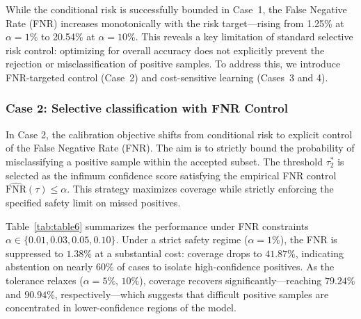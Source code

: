 \documentclass[sigconf,review,anonymous]{acmart}
\theoremstyle{remark}
\begin{document}
While the conditional risk is successfully bounded in Case~1, the False Negative Rate (FNR) increases monotonically with the risk target—rising from 1.25\% at $\alpha=1\%$ to 20.54\% at $\alpha=10\%$. This reveals a key limitation of standard selective risk control: optimizing for overall accuracy does not explicitly prevent the rejection or misclassification of positive samples. To address this, we introduce FNR-targeted control (Case~2) and cost-sensitive learning (Cases~3 and 4).

\subsubsection{\textbf{Case 2: Selective classification with FNR Control}}
\label{sec:case2_results}

In Case 2, the calibration objective shifts from conditional risk to explicit control of the False Negative Rate (FNR). The aim is to strictly bound the probability of misclassifying a positive sample within the accepted subset. The threshold $\tau_2^*$ is selected as the infimum confidence score satisfying the empirical FNR control $\widehat{\mathrm{FNR}}(\tau) \le \alpha$. This strategy maximizes coverage while strictly enforcing the specified safety limit on missed positives.

\begin{table}[htbp]
    \centering
    \caption{The selective classification performance of Case 2.}
    \label{tab:table6}
    \vskip -0.1in
\end{table}

Table~\ref{tab:table6} summarizes the performance under FNR constraints $\alpha \in \{0.01, 0.03, 0.05, 0.10\}$. Under a strict safety regime ($\alpha=1\%$), the FNR is suppressed to $1.38\%$ at a substantial cost: coverage drops to $41.87\%$, indicating abstention on nearly $60\%$ of cases to isolate high-confidence positives. As the tolerance relaxes ($\alpha=5\%$, $10\%$), coverage recovers significantly—reaching $79.24\%$ and $90.94\%$, respectively—which suggests that difficult positive samples are concentrated in lower-confidence regions of the model.
\end{document}
